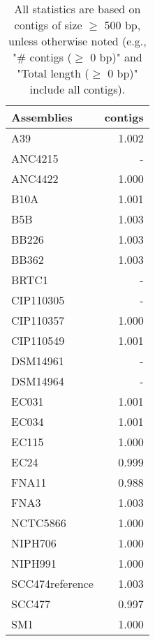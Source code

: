 \documentclass[12pt,a4paper]{article}
\begin{document}
\begin{table}[ht]
\begin{center}
\caption{All statistics are based on contigs of size $\geq$ 500 bp, unless otherwise noted (e.g., "\# contigs ($\geq$ 0 bp)" and "Total length ($\geq$ 0 bp)" include all contigs).}
\begin{tabular}{|l*{1}{|r}|}
\hline
Assemblies & contigs \\ \hline
A39 & 1.002 \\ \hline
ANC4215 & - \\ \hline
ANC4422 & 1.000 \\ \hline
B10A & 1.001 \\ \hline
B5B & 1.003 \\ \hline
BB226 & 1.003 \\ \hline
BB362 & 1.003 \\ \hline
BRTC1 & - \\ \hline
CIP110305 & - \\ \hline
CIP110357 & 1.000 \\ \hline
CIP110549 & 1.001 \\ \hline
DSM14961 & - \\ \hline
DSM14964 & - \\ \hline
EC031 & 1.001 \\ \hline
EC034 & 1.001 \\ \hline
EC115 & 1.000 \\ \hline
EC24 & 0.999 \\ \hline
FNA11 & 0.988 \\ \hline
FNA3 & 1.003 \\ \hline
NCTC5866 & 1.000 \\ \hline
NIPH706 & 1.000 \\ \hline
NIPH991 & 1.000 \\ \hline
SCC474reference & 1.003 \\ \hline
SCC477 & 0.997 \\ \hline
SM1 & 1.000 \\ \hline
\end{tabular}
\end{center}
\end{table}
\end{document}
